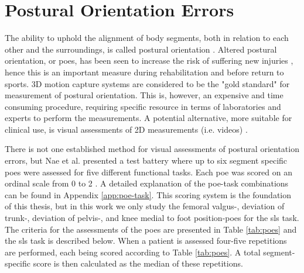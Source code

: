 
\section{Postural Orientation Errors}
The ability to uphold the alignment of body segments, both in relation to each other and the surroundings, is called postural orientation \cite{Horak2006}. Altered postural orientation, or \glspl{poe}, has been seen to increase the risk of suffering new injuries \cite{Hewett2005}, hence this is an important measure during rehabilitation and before return to sports. 3D motion capture systems are considered to be the "gold standard" for measurement of postural orientation. This is, however, an expensive and time consuming procedure, requiring specific resource in terms of laboratories and experts to perform the measurements. A potential alternative, more suitable for clinical use, is visual assessments of 2D measurements (i.e. videos) \cite{Nae2020}.

There is not one established method for visual assessments of postural orientation errors, but Nae et al. presented a test battery where up to six segment specific \glspl{poe} were assessed for five different functional tasks. Each \gls{poe} was scored on an ordinal scale from 0 to 2 \cite{Nae2017, Nae2020b}.
A detailed explanation of the \gls{poe}-task combinations can be found in Appendix \ref{app:poe-task}. This scoring system is the foundation of this thesis, but in this work we only study the femoral valgus-, deviation of trunk-, deviation of pelvis-, and knee medial to foot position-\glspl{poe} for the \gls{sls} task. The criteria for the assessments of the \glspl{poe} are presented in Table \ref{tab:poes} and the \gls{sls} task is described below. When a patient is assessed four-five repetitions are performed, each being scored according to Table \ref{tab:poes}. A total segment-specific score is then calculated as the median of these repetitions.

